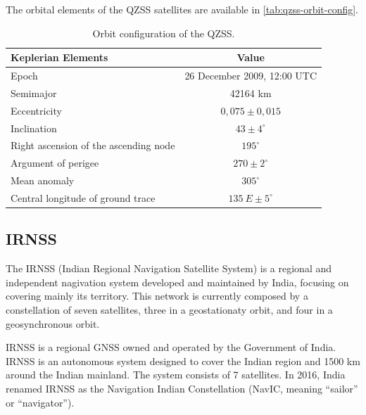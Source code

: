 The orbital elements of the QZSS satellites are available in \autoref{tab:qzss-orbit-config}.

\begin{table}[!h]
    \centering
    \begin{tabular}{lc}
        \toprule[1.5pt]
        \textbf{Keplerian Elements} & \textbf{Value} \\
        \midrule
        Epoch                                   & 26 December 2009, 12:00 UTC \\
        Semimajor                               & 42164 km \\
        Eccentricity                            & $0,075 \pm 0,015$ \\
        Inclination                             & $43 \pm 4^{\circ}$ \\
        Right ascension of the ascending node   & $195^{\circ}$ \\
        Argument of perigee                     & $270 \pm 2^{\circ}$ \\
        Mean anomaly                            & $305^{\circ}$ \\
        Central longitude of ground trace       & $135\ E \pm 5^{\circ}$ \\
        \bottomrule[1.5pt]
    \end{tabular}
    \caption{Orbit configuration of the QZSS.}
    \label{tab:qzss-orbit-config}
\end{table}

\subsection{IRNSS}

The IRNSS (Indian Regional Navigation Satellite System) \cite{irnss} is a regional and independent nagivation system developed and maintained by India, focusing on covering mainly its territory. This network is currently composed by a constellation of seven satellites, three in a geostationaty orbit, and four in a geosynchronous orbit.

IRNSS is a regional GNSS owned and operated by the Government of India. IRNSS is an autonomous system designed to cover the Indian region and 1500 km around the Indian mainland. The system consists of 7 satellites. In 2016, India renamed IRNSS as the Navigation Indian Constellation (NavIC, meaning ``sailor'' or ``navigator'').

